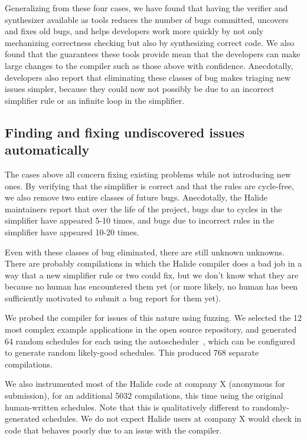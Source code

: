 \documentclass[acmsmall,review,anonymous]{acmart}\settopmatter{printfolios=true,printccs=false,printacmref=false}
\begin{document}
Generalizing from these four cases, we have found that having the verifier and synthesizer available as tools reduces the number of bugs committed, uncovers and fixes old bugs, and helps developers work more quickly by not only mechanizing correctness checking but also by synthesizing correct code. We also found that the guarantees these tools provide mean that the developers can make large changes to the compiler such as those above with confidence. Anecdotally, developers also report that eliminating these classes of bug makes triaging new issues simpler, because they could now not possibly be due to an incorrect simplifier rule or an infinite loop in the simplifier.

\subsection{Finding and fixing undiscovered issues automatically}
\label{ssec:compilationspeed}
The cases above all concern fixing existing problems while not introducing new ones. By verifying that the simplifier is correct and that the rules are cycle-free, we also remove two entire classes of future bugs. Anecdotally, the Halide maintainers report that over the life of the project, bugs due to cycles in the simplifier have appeared 5-10 times, and bugs due to incorrect rules in the simplifier have appeared 10-20 times.

Even with these classes of bug eliminated, there are still unknown unknowns. There are probably compilations in which the Halide compiler does a bad job in a way that a new simplifier rule or two could fix, but we don’t know what they are because no human has encountered them yet (or more likely, no human has been sufficiently motivated to submit a bug report for them yet). 

We probed the compiler for issues of this nature using fuzzing. We selected the 12 most complex example applications in the open source repository, and generated 64 random schedules for each using the autoscheduler~\cite{Adams2019}, which can be configured to generate random likely-good schedules. This produced 768 separate compilations.

We also instrumented most of the Halide code at company X (anonymous for submission), for an additional 5032 compilations, this time using the original human-written schedules. Note that this is qualitatively different to randomly-generated schedules. We do not expect Halide users at company X would check in code that behaves poorly due to an issue with the compiler.
\end{document}
